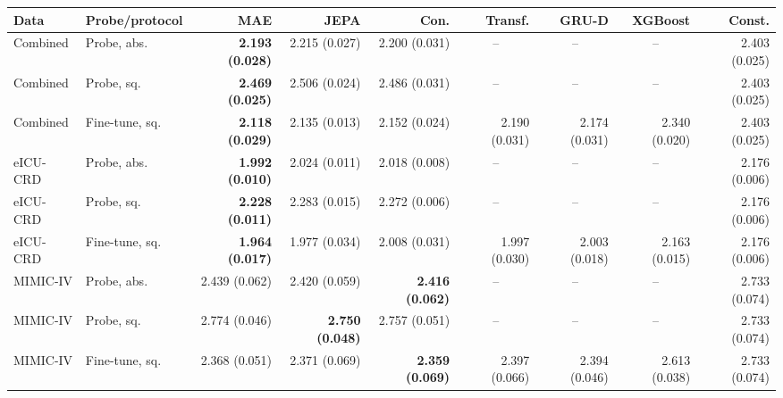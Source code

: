 \setlength{\tabcolsep}{2.5pt}
\begin{tabular}{@{}llrrrrrrr@{}}
\toprule
Data & Probe/protocol & MAE & JEPA & Con. & Transf. & GRU-D & XGBoost & Const. \\
\midrule
Combined & Probe, abs. & \textbf{2.193 (0.028)} & 2.215 (0.027) & 2.200 (0.031) & \multicolumn{1}{c}{--} & \multicolumn{1}{c}{--} & \multicolumn{1}{c}{--} & 2.403 (0.025) \\
Combined & Probe, sq. & \textbf{2.469 (0.025)} & 2.506 (0.024) & 2.486 (0.031) & \multicolumn{1}{c}{--} & \multicolumn{1}{c}{--} & \multicolumn{1}{c}{--} & 2.403 (0.025) \\
Combined & Fine-tune, sq. & \textbf{2.118 (0.029)} & 2.135 (0.013) & 2.152 (0.024) & 2.190 (0.031) & 2.174 (0.031) & 2.340 (0.020) & 2.403 (0.025) \\
eICU-CRD & Probe, abs. & \textbf{1.992 (0.010)} & 2.024 (0.011) & 2.018 (0.008) & \multicolumn{1}{c}{--} & \multicolumn{1}{c}{--} & \multicolumn{1}{c}{--} & 2.176 (0.006) \\
eICU-CRD & Probe, sq. & \textbf{2.228 (0.011)} & 2.283 (0.015) & 2.272 (0.006) & \multicolumn{1}{c}{--} & \multicolumn{1}{c}{--} & \multicolumn{1}{c}{--} & 2.176 (0.006) \\
eICU-CRD & Fine-tune, sq. & \textbf{1.964 (0.017)} & 1.977 (0.034) & 2.008 (0.031) & 1.997 (0.030) & 2.003 (0.018) & 2.163 (0.015) & 2.176 (0.006) \\
MIMIC-IV & Probe, abs. & 2.439 (0.062) & 2.420 (0.059) & \textbf{2.416 (0.062)} & \multicolumn{1}{c}{--} & \multicolumn{1}{c}{--} & \multicolumn{1}{c}{--} & 2.733 (0.074) \\
MIMIC-IV & Probe, sq. & 2.774 (0.046) & \textbf{2.750 (0.048)} & 2.757 (0.051) & \multicolumn{1}{c}{--} & \multicolumn{1}{c}{--} & \multicolumn{1}{c}{--} & 2.733 (0.074) \\
MIMIC-IV & Fine-tune, sq. & 2.368 (0.051) & 2.371 (0.069) & \textbf{2.359 (0.069)} & 2.397 (0.066) & 2.394 (0.046) & 2.613 (0.038) & 2.733 (0.074) \\
\bottomrule
\end{tabular}
